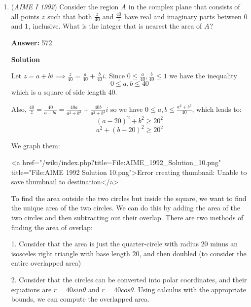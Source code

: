 \begin{enumerate}
 



\textbf{Solution 6}

As the problem tells, the circle is tangent to both sides $AD,BC$, we can make it up to a triangle $QAB$ and $P$ must lie on its angular bisector. Then we know that $AP:BP=7:5$, which makes $AP = \frac{7}{12}(AB) = \frac{92\times 7}{12} = \frac{161}{3}$. Thus, $m + n = 164$.

 


	\item (\textit{AIME I 1992}) Consider the region $A^{}_{}$ in the complex plane that consists of all points $z^{}_{}$ such that both $\frac{z^{}_{}}{40}$ and $\frac{40^{}_{}}{\overline{z}}$ have real and imaginary parts between $0^{}_{}$ and $1^{}_{}$, inclusive. What is the integer that is nearest the area of $A^{}_{}$?


 
 \textbf{Answer: }572



\textbf{Solution}

Let $z=a+bi \implies \frac{z}{40}=\frac{a}{40}+\frac{b}{40}i$. Since $0\leq \frac{a}{40},\frac{b}{40}\leq 1$ we have the inequality 
 \[0\leq a,b \leq 40\]which is a square of side length $40$.

 Also, $\frac{40}{\overline{z}}=\frac{40}{a-bi}=\frac{40a}{a^2+b^2}+\frac{40b}{a^2+b^2}i$ so we have $0\leq a,b \leq \frac{a^2+b^2}{40}$, which leads to:
 \[(a-20)^2+b^2\geq 20^2\]
 \[a^2+(b-20)^2\geq 20^2\]

 We graph them:

 <a href="/wiki/index.php?title=File:AIME\_1992\_Solution\_10.png" title="File:AIME 1992 Solution 10.png">Error creating thumbnail: Unable to save thumbnail to destination</a>

 To find the area outside the two circles but inside the square, we want to find the unique area of the two circles. We can do this by adding the area of the two circles and then subtracting out their overlap. There are two methods of finding the area of overlap:

 1. Consider that the area is just the quarter-circle with radius $20$ minus an isosceles right triangle with base length $20$, and then doubled (to consider the entire overlapped area)

 2. Consider that the circles can be converted into polar coordinates, and their equations are $r = 40sin\theta$ and $r = 40cos\theta$. Using calculus with the appropriate bounds, we can compute the overlapped area.


\end{enumerate}
